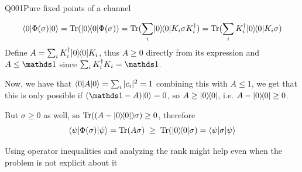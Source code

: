 \begin{entry}{Q001}{Pure fixed points of a channel}
\begin{solution}[Part (a)]
\end{solution}

\begin{solution}[Part (b)]
\begin{equation}
    \langle 0 \vert \Phi(\sigma) \vert 0 \rangle = \operatorname{Tr}(\lvert 0 \rangle\!\langle 0 \rvert\Phi(\sigma))=\operatorname{Tr}(\sum_i\lvert 0 \rangle\!\langle 0 \rvert K_i\sigma K_i^\dagger)=\operatorname{Tr}(\sum_iK_i^\dagger\lvert 0 \rangle\!\langle 0 \rvert K_i\sigma )
\end{equation}
Define $A=\sum_iK_i^\dagger\lvert 0 \rangle\!\langle 0 \rvert K_i$, thus $A\geq 0$ directly from its expression and $A \leq \id$ since $ \sum_i K_i^{\dagger} K_i = \id$. 

Now, we have that $\langle 0 \vert A \vert 0 \rangle=\sum_i |c_i|^2=1$ combining this with $A\leq 1$, we get that this is only possible if $(\id - A) \ket{0}=0$, so $A\geq \lvert 0 \rangle\!\langle 0 \rvert$, i.e. $A-\lvert 0 \rangle\!\langle 0 \rvert \geq 0$. 

But $\sigma \geq 0$ as well, so $\operatorname{Tr}((A-\lvert 0 \rangle\!\langle 0 \rvert)\sigma) \geq 0$, therefore
\begin{equation}
\langle \psi \vert \Phi(\sigma) \vert \psi \rangle= \operatorname{Tr}(A\sigma) \;\ge\; \operatorname{Tr}(\lvert 0 \rangle\!\langle 0 \rvert\sigma)=\langle \psi \vert \sigma \vert \psi \rangle
\end{equation}
\end{solution}


\begin{takeaway}
Using operator inequalities and analyzing the rank might help even when the problem is not explicit about it
\end{takeaway}


\end{entry}

